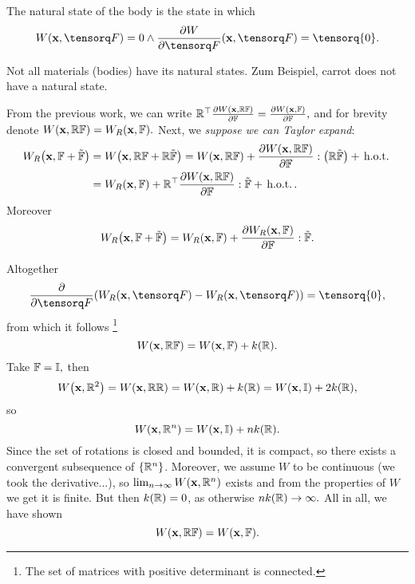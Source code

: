 \documentclass[reqno, a4paper]{article}
\begin{document}
\begin{definition}
    The natural state of the body is the state in which
    \begin{equation}
	    \label{eq:natural}
	    W(\vb{x},\fgrad) = 0 \wedge \pdv{W}{\fgrad}\qty(\vb{x},\fgrad) = \tensorq{0}.
    \end{equation}
\end{definition}

\begin{remark}
    Not all materials (bodies) have its natural states. Zum Beispiel, carrot does not have a natural state.
\end{remark}

From the previous work, we can write $\mathbb{R}^\top \pdv{W\qty(\vb{x}, \ensuremath{\mathbb{R}} \ensuremath{\mathbb{F}})}{\ensuremath{\mathbb{F}}} = \pdv{W\qty(\vb{x}, \ensuremath{\mathbb{F}})}{\ensuremath{\mathbb{F}}},$ and for brevity denote $W\qty(\vb{x}, \mathbb{R}\mathbb{F}) = W_R(\vb{x}, \mathbb{F}).$ Next, we \textit{suppose we can Taylor expand}:
\begin{align*}
	W_R\qty(\vb{x}, \mathbb{F} + \tilde{\mathbb{F}}) &= W\qty(\vb{x}, \mathbb{R}\mathbb{F} + \mathbb{R}\tilde{\mathbb{F}}) = W\qty(\vb{x}, \mathbb{R} \mathbb{F}) + \pdv{W\qty(\vb{x},\ensuremath{\mathbb{R}} \ensuremath{\mathbb{F}})}{\ensuremath{\mathbb{F}}}:\qty(\mathbb{R} \tilde{\mathbb{F}}) + \, \text{h.o.t.} \, \\&= W_R\qty(\vb{x}, \mathbb{F})+ \mathbb{R}^\top \pdv{W\qty(\vb{x}, \ensuremath{\mathbb{R}}\ensuremath{\mathbb{F}})}{\ensuremath{\mathbb{F}}}:\tilde{\mathbb{F}} + \, \text{h.o.t.} \,.
\end{align*}
Moreover
\[
	W_R\qty(\vb{x},\mathbb{F}+\tilde{\mathbb{F}}) = W_R\qty(\vb{x},\mathbb{F})+ \pdv{W_R\qty(\vb{x},\ensuremath{\mathbb{F}})}{\ensuremath{\mathbb{F}}}: \tilde{\mathbb{F}}.
\]

Altogether
\[
	\pdv{\fgrad}\qty(W_R\qty(\vb{x},\fgrad)-W_R\qty(\vb{x},\fgrad)) = \tensorq{0},
\]
from which it follows \footnote{The set of matrices with positive determinant is connected.}
\[
	W\qty(\vb{x},\mathbb{R} \mathbb{F}) = W\qty(\vb{x},\mathbb{F}) + k\qty(\mathbb{R}).
\]
Take $\mathbb{F} = \mathbb{I},$ then
\[
	W\qty(\vb{x}, \mathbb{R}^{2}) = W\qty(\vb{x},\mathbb{R}\mathbb{R}) = W\qty(\vb{x},\mathbb{R})+k\qty(\mathbb{R}) = W\qty(\vb{x},\mathbb{I})+2 k\qty(\mathbb{R}),
\]
 so
\[
	W\qty(\vb{x},\mathbb{R}^n)=W\qty(\vb{x},\mathbb{I})+nk\qty(\mathbb{R}).
\]
Since the set of rotations is closed and bounded, it is compact, so there exists a convergent subsequence of $\{\mathbb{R}^n\}$. Moreover, we assume $W$ to be continuous (we took the derivative...), so $\lim_{n \to \infty}W\qty(\vb{x},\mathbb{R}^n)$ exists and from the properties of $W$ we get it is finite. But then $k\qty(\mathbb{R}) = 0$, as otherwise $nk\qty(\mathbb{R})\to \infty.$ All in all, we have shown
\begin{equation}
    W\qty(\vb{x}, \mathbb{R}\mathbb{F}) = W\qty(\vb{x},\mathbb{F}).
\end{equation}
\end{document}

